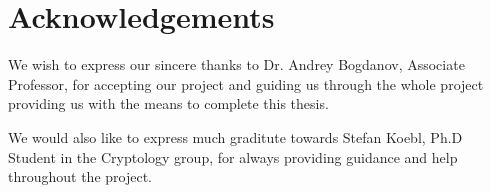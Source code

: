 \chapter{Acknowledgements}


We wish to express our sincere thanks to Dr. Andrey Bogdanov,
Associate Professor, for accepting our project and guiding us through
the whole project providing us with the means to complete this thesis.

We would also like to express much graditute towards Stefan Koebl,
Ph.D Student in the Cryptology group, for always providing guidance
and help throughout the project.



